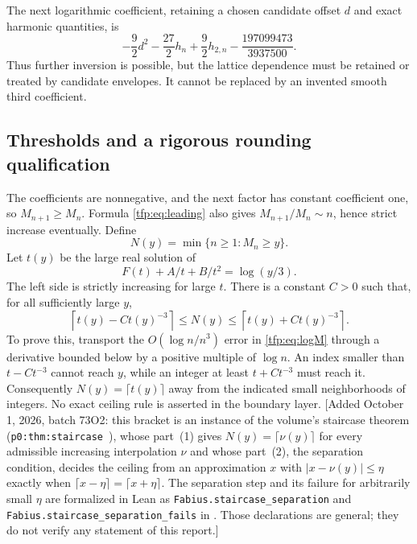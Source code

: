 \documentclass[11pt,a4paper]{article}
\numberwithin{equation}{section}
\theoremstyle{definition}\newtheorem{definition}[theorem]{Definition}
\theoremstyle{remark}\newtheorem{remark}[theorem]{Remark}
\begin{document}
The next logarithmic coefficient, retaining a chosen candidate offset
$d$ and exact harmonic quantities, is
\begin{equation}\label{tfp:eq:logthird}
 -\frac92d^2-\frac{27}2h_n+\frac92h_{2,n}
                        -\frac{197099473}{3937500}.
\end{equation}
Thus further inversion is possible, but the lattice dependence must be
retained or treated by candidate envelopes. It cannot be replaced by
an invented smooth third coefficient.

\subsection{Thresholds and a rigorous rounding qualification}
The coefficients are nonnegative, and the next factor has constant
coefficient one, so $M_{n+1}\ge M_n$. Formula \eqref{tfp:eq:leading} also
gives $M_{n+1}/M_n\sim n$, hence strict increase eventually. Define
\begin{equation}
 N(y)=\min\{n\ge1:M_n\ge y\}.
\end{equation}
Let $t(y)$ be the large real solution of
\begin{equation}\label{tfp:eq:smoothinverse}
 F(t)+A/t+B/t^2=\log(y/3).
\end{equation}
The left side is strictly increasing for large $t$.
There is a constant $C>0$ such that, for all sufficiently large $y$,
\begin{equation}\label{tfp:eq:thresholdbracket}
 \left\lceil t(y)-Ct(y)^{-3}\right\rceil
       \le N(y)\le
 \left\lceil t(y)+Ct(y)^{-3}\right\rceil.
\end{equation}
To prove this, transport the $O(\log n/n^3)$ error in \eqref{tfp:eq:logM}
through a derivative bounded below by a positive multiple of $\log n$.
An index smaller than $t-Ct^{-3}$ cannot reach $y$, while an integer
at least $t+Ct^{-3}$ must reach it. Consequently $N(y)=\lceil t(y)\rceil$
away from the indicated small neighborhoods of integers. No exact
ceiling rule is asserted in the boundary layer.
[Added October 1, 2026, batch 73O2: this bracket is an instance of the
volume's staircase theorem (\texttt{p0:thm:staircase}~\cite{tai}), whose
part~(1) gives $N(y)=\lceil\nu(y)\rceil$ for every admissible increasing
interpolation $\nu$ and whose part~(2), the separation condition, decides the
ceiling from an approximation $x$ with $|x-\nu(y)|\le\eta$ exactly when
$\lceil x-\eta\rceil=\lceil x+\eta\rceil$. The separation step and its
failure for arbitrarily small $\eta$ are formalized in Lean as
\texttt{Fabius.staircase\_separation} and
\texttt{Fabius.staircase\_separation\_fails} in
.
Those declarations are general; they do not verify any statement of this
report.]
\end{document}
